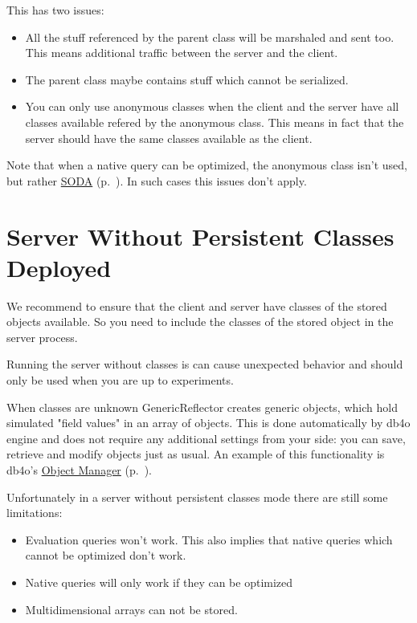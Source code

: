 This has two issues:

\begin{itemize}
\item All the stuff referenced by the parent class will be marshaled and sent too. This means additional traffic between the server and the client.
\item The parent class maybe contains stuff which cannot be serialized.
\item You can only use anonymous classes when the client and the server have all classes available refered by the anonymous class. This means in fact that the server should have the same classes available as the client.
\end{itemize}

Note that when a native query can be optimized, the anonymous class isn't used, but rather \hyperref[ref:basics-querying-soda-query]{SODA} (p.~\pageref{ref:basics-querying-soda-query}). In such cases this issues don't apply.

\section{Server Without Persistent Classes Deployed}
\label{ref:client-server-server-without-persistent-classes-deployed}

We recommend to ensure that the client and server have classes of the stored objects available. So you need to include the classes of the stored object in the server process.

Running the server without classes is can cause unexpected behavior and should only be used when you are up to experiments.

When classes are unknown GenericReflector creates generic objects, which hold simulated "field values" in an array of objects. This is done automatically by db4o engine and does not require any additional settings from your side: you can save, retrieve and modify objects just as usual. An example of this functionality is db4o's \hyperref[ref:object-manager-enterprise]{Object Manager} (p.~\pageref{ref:object-manager-enterprise}).

Unfortunately in a server without persistent classes mode there are still some limitations:

\begin{itemize}
\item Evaluation queries won't work. This also implies that native queries which cannot be optimized don't work.
\item Native queries will only work if they can be optimized
\item Multidimensional arrays can not be stored.
\end{itemize}

